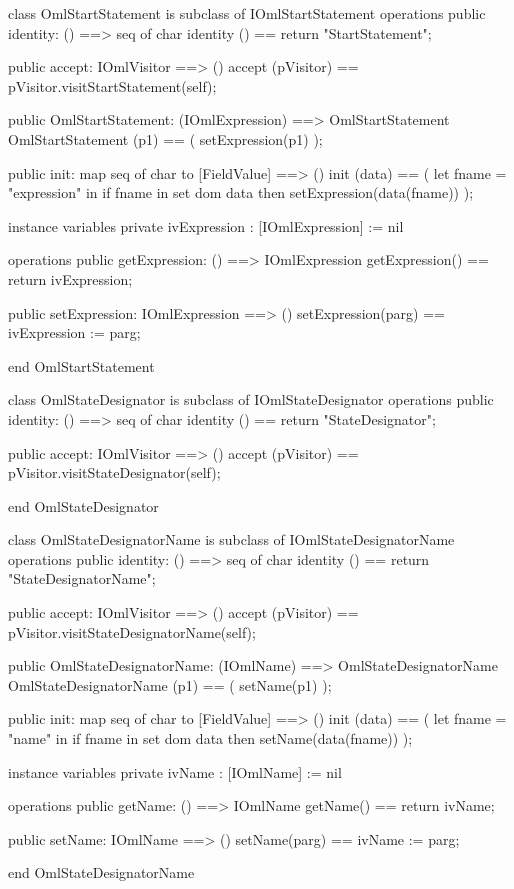 \begin{vdm_al}
class OmlStartStatement is subclass of IOmlStartStatement
operations
  public identity: () ==> seq of char
  identity () == return "StartStatement";

  public accept: IOmlVisitor ==> ()
  accept (pVisitor) == pVisitor.visitStartStatement(self);

  public OmlStartStatement:
      (IOmlExpression) ==> OmlStartStatement
  OmlStartStatement (p1) == 
   ( setExpression(p1) );

  public init: map seq of char to [FieldValue] ==> ()
  init (data) ==
    ( let fname = "expression" in
        if fname in set dom data
        then setExpression(data(fname)) );

instance variables
  private ivExpression : [IOmlExpression] := nil

operations
  public getExpression: () ==> IOmlExpression
  getExpression() == return ivExpression;

  public setExpression: IOmlExpression ==> ()
  setExpression(parg) == ivExpression := parg;

end OmlStartStatement
\end{vdm_al}

\begin{vdm_al}
class OmlStateDesignator is subclass of IOmlStateDesignator
operations
  public identity: () ==> seq of char
  identity () == return "StateDesignator";

  public accept: IOmlVisitor ==> ()
  accept (pVisitor) == pVisitor.visitStateDesignator(self);

end OmlStateDesignator
\end{vdm_al}
\begin{vdm_al}
class OmlStateDesignatorName is subclass of IOmlStateDesignatorName
operations
  public identity: () ==> seq of char
  identity () == return "StateDesignatorName";

  public accept: IOmlVisitor ==> ()
  accept (pVisitor) == pVisitor.visitStateDesignatorName(self);

  public OmlStateDesignatorName:
      (IOmlName) ==> OmlStateDesignatorName
  OmlStateDesignatorName (p1) == 
   ( setName(p1) );

  public init: map seq of char to [FieldValue] ==> ()
  init (data) ==
    ( let fname = "name" in
        if fname in set dom data
        then setName(data(fname)) );

instance variables
  private ivName : [IOmlName] := nil

operations
  public getName: () ==> IOmlName
  getName() == return ivName;

  public setName: IOmlName ==> ()
  setName(parg) == ivName := parg;

end OmlStateDesignatorName
\end{vdm_al}

